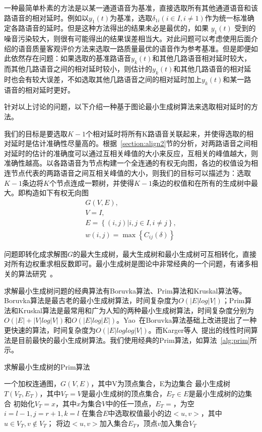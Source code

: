 一种最简单朴素的方法是以某一通道语音为基准，直接选取所有其他通道语音和该路语音的相对延时。例如以$y_1 (t)$为基准，选取$\delta_{1i}  (i \in I, i \neq 1)$作为统一标准确定各路语音的延时。但是这种方法得出的结果未必是最优的，如果 $y_1 (t)$ 受到的噪音污染较大，则很有可能得出的结果误差相当大。对此问题可以考虑使用后面介绍的语音质量客观评价方法来选取一路质量最优的语音作为参考基准。但是即便如此依然存在问题：如果选取的基准路语音$y_k (t)$和其他几路语音相对延时较大，而其他几路语音之间的相对延时较小，则估计的$y_k (t)$和其他几路语音的相对延时也会有较大误差，不如选取其他几路语音之间的相对延时加上$y_k (t)$和某一路语音的相对延时更好。

针对以上讨论的问题，以下介绍一种基于图论最小生成树算法来选取相对延时的方法。

我们的目标是要选取$K-1$个相对延时将所有K路语音关联起来，并使得选取的相对延时是估计准确性尽量高的。根据~\ref{section:align2}节的分析，对两路语音之间相对延时的估计的准确度可以通过互相关峰值的大小来反应，互相关的峰值越大，则准确性越高。以各路语音为节点构建一个全连通的有权无向图，各边的权值设为相连节点代表的两路语音之间互相关峰值的大小，则我们的目标可以描述为：选取$K-1$条边将$K$个节点连成一颗树，并使得$K-1$条边的权值和在所有的生成树中最大。即构造如下有权无向图
\begin{equation}
\begin{array}{l}
G(V,E), \\
V = I, \\
E = \left\{(i,j)|i, j\in I, i \neq j\right\}, \\
w(i,j)=\max⁡ \left\{ C_{ij}(\delta) \right\}
\end{array}
\end{equation}

问题即转化成求解图$G$的最大生成树，最大生成树和最小生成树可互相转化，直接对所有边权重求相反数即可。最小生成树是图论中非常经典的一个问题，有诸多相关的算法研究~\cite{bazlamaccci2001minimum}。

求解最小生成树问题的经典算法有Boruvka算法、Prim算法和Kruskal算法等。Boruvka算法是最古老的最小生成树算法，时间复杂度为$O(|E|log|V|)$；Prim算法和Kruskal算法是最常用和广为人知的两种最小生成树算法，时间复杂度分别为$O(|E|+|V|log|V|)$和$O(|E|log|E|)$。Yao~\cite{yao19750}在Boruvka算法基础上改进提出了一种更快速的算法，时间复杂度为$O(|E|loglog|V|)$。而Karger等人~\cite{karger1995randomized}提出的线性时间算法是目前最快的最小生成树算法。我们使用经典的Prim算法，如算法~\ref{alg:prim}所示。

\begin{algorithm}
    \caption{求解最小生成树的Prim算法}
    \label{alg:prim}
\begin{algorithmic}[1]
\INPUT
    \Statex 一个加权连通图，$G(V, E)$，其中V为顶点集合，E为边集合
\OUTPUT
    \Statex 最小生成树$T(V_T, E_T)$，其中$V_T = V$是最小生成树的顶点集合，$E_T \in E$是最小生成树的边集合
\State 初始化$V_T = {x}$，其中$x$为集合$V$中的任一顶点，$E_T = {}$，为空
\State $i=l-1, j=r+1, k=l$
    \State 在集合$E$中选取权值最小的边$<u, v>$，其中$u \in V_T, v \not\in V_T$；
    \State 将边$<u, v>$加入集合$E_T$，顶点$v$加入集合$V_T$
\EndWhile
\end{algorithmic}
\end{algorithm}

